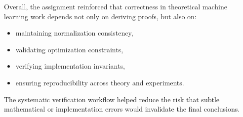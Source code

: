 \documentclass[11pt]{article}
\begin{document}
\begin{enumerate}
\begin{solutionbox}
\medskip

Overall, the assignment reinforced that correctness in theoretical machine learning work depends not only on deriving proofs, but also on:
\begin{itemize}
    \item maintaining normalization consistency,
    \item validating optimization constraints,
    \item verifying implementation invariants,
    \item ensuring reproducibility across theory and experiments.
\end{itemize}

The systematic verification workflow helped reduce the risk that subtle mathematical or implementation errors would invalidate the final conclusions.

\end{solutionbox}

\end{enumerate}
\end{document}
